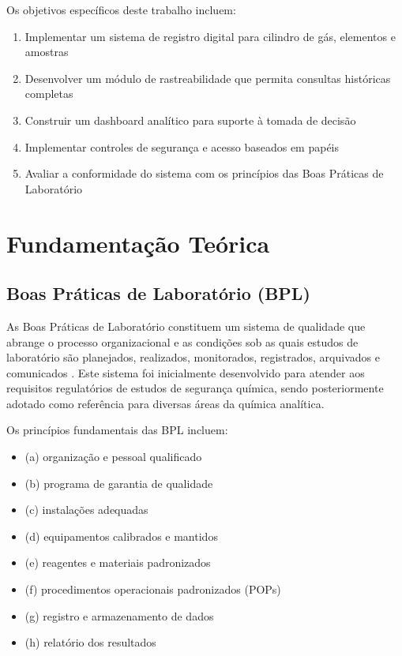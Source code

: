 \documentclass[12pt,a4paper]{article}
\providecommand\关键字[1]{\textbf{#1}}
\begin{document}
Os objetivos específicos deste trabalho incluem:

\begin{enumerate}
\item Implementar um sistema de registro digital para cilindro de gás, elementos e amostras
\item Desenvolver um módulo de rastreabilidade que permita consultas históricas completas
\item Construir um dashboard analítico para suporte à tomada de decisão
\item Implementar controles de segurança e acesso baseados em papéis
\item Avaliar a conformidade do sistema com os princípios das Boas Práticas de Laboratório
\end{enumerate}

\section{Fundamentação Teórica}

\subsection{Boas Práticas de Laboratório (BPL)}

As Boas Práticas de Laboratório constituem um sistema de qualidade que abrange o processo organizacional e as condições sob as quais estudos de laboratório são planejados, realizados, monitorados, registrados, arquivados e comunicados \cite{oecd1998}. Este sistema foi inicialmente desenvolvido para atender aos requisitos regulatórios de estudos de segurança química, sendo posteriormente adotado como referência para diversas áreas da química analítica.

Os princípios fundamentais das BPL incluem:

\begin{itemize}
\item (a) organização e pessoal qualificado
\item (b) programa de garantia de qualidade
\item (c) instalações adequadas
\item (d) equipamentos calibrados e mantidos
\item (e) reagentes e materiais padronizados
\item (f) procedimentos operacionais padronizados (POPs)
\item (g) registro e armazenamento de dados
\item (h) relatório dos resultados \cite{anvisa2009}
\end{itemize}
\end{document}
